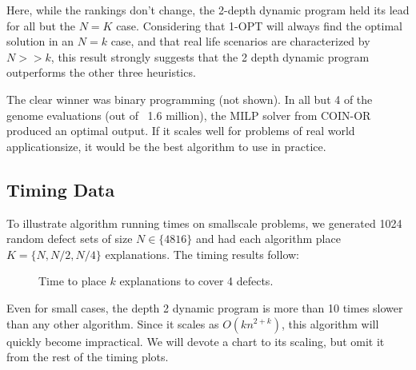 Here, while the rankings don't change, the 2-depth dynamic program held its lead for all but the $N=K$ case.  Considering that 1-OPT will always find the optimal solution in an $N=k$ case, and that real life scenarios are characterized by $N>>k$, this result strongly suggests that the 2 depth dynamic program outperforms the other three heuristics.  

The clear winner was binary programming (not shown).  In all but 4 of the genome evaluations (out of ~1.6 million), the MILP solver from COIN-OR produced an optimal output.  If it scales well for problems of real world applicationsize, it would be the best algorithm to use in practice.

\FloatBarrier

\subsection{Timing Data}

To illustrate algorithm running times on smallscale problems, we generated 1024 random defect sets of size $N \in \{4 8 16\}$ and had each algorithm place $K = \{ N, N/2, N/4\}$ explanations.  The timing results follow:

\begin{figure}[ht!] \centering
  \caption{Time to place $k$ explanations to cover 4 defects.}
\end{figure}
\FloatBarrier

Even for small cases, the depth 2 dynamic program is more than 10 times slower than any other algorithm.  Since it scales as $O(kn^{2+k})$, this algorithm will quickly become impractical.  We will devote a chart to its scaling, but omit it from the rest of the timing plots.

